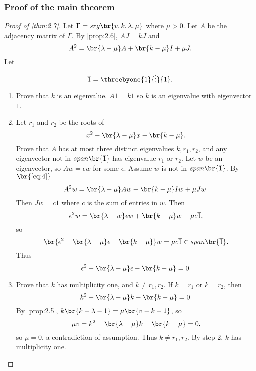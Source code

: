 \subsubsection{Proof of the main theorem}

\begin{proof}[Proof of \ref{thm:2.7}]
Let $ \Gamma = srg\br{v, k, \lambda, \mu} $ where $ \mu > 0 $. Let $ A $ be the adjacency matrix of $ \Gamma $. By \ref{prop:2.6}, $ AJ = kJ $ and
\begin{equation}
\label{eq:4}
A^2 = \br{\lambda - \mu}A + \br{k - \mu}I + \mu J.
\end{equation}
Let
$$ \overline{1} = \threebyone{1}{\vdots}{1}. $$
\begin{enumerate}[leftmargin=0.5in, label=Step \arabic*.]
\item Prove that $ k $ is an eigenvalue. $ A\overline{1} = k\overline{1} $ so $ k $ is an eigenvalue with eigenvector $ \overline{1} $.
\item Let $ r_1 $ and $ r_2 $ be the roots of
$$ x^2 - \br{\lambda - \mu}x - \br{k - \mu}. $$
Prove that $ A $ has at most three distinct eigenvalues $ k, r_1, r_2 $, and any eigenvector not in $ span\br{\overline{1}} $ has eigenvalue $ r_1 $ or $ r_2 $. Let $ w $ be an eigenvector, so $ Aw = \epsilon w $ for some $ \epsilon $. Assume $ w $ is not in $ span\br{\overline{1}} $. By $ \br{\ref{eq:4}} $
$$ A^2w = \br{\lambda - \mu}Aw + \br{k - \mu}Iw + \mu Jw. $$
Then $ Jw = c\overline{1} $ where $ c $ is the sum of entries in $ w $. Then
$$ \epsilon^2w = \br{\lambda - w}\epsilon w + \br{k - \mu}w + \mu c\overline{1}, $$
so
$$ \br{\epsilon^2 - \br{\lambda - \mu}\epsilon - \br{k - \mu}}w = \mu c\overline{1} \in span\br{\overline{1}}. $$
Thus
$$ \epsilon^2 - \br{\lambda - \mu}\epsilon - \br{k - \mu} = 0. $$
\item Prove that $ k $ has multiplicity one, and $ k \ne r_1, r_2 $. If $ k = r_1 $ or $ k = r_2 $, then
$$ k^2 - \br{\lambda - \mu}k - \br{k - \mu} = 0. $$
By \ref{prop:2.5}, $ k\br{k - \lambda - 1} = \mu\br{v - k - 1} $, so
$$ \mu v = k^2 - \br{\lambda - \mu}k - \br{k - \mu} = 0, $$
so $ \mu = 0 $, a contradiction of assumption. Thus $ k \ne r_1, r_2 $. By step $ 2 $, $ k $ has multiplicity one.

\pagebreak


\end{enumerate}
\end{proof}
